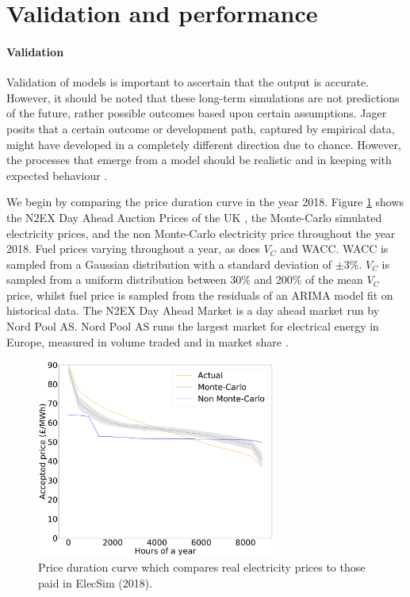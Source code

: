 \section{Validation and performance}
\paragraph{Validation}

Validation of models is important to ascertain that the output is accurate. However, it should be noted that these long-term simulations are not predictions of the future, rather possible outcomes based upon certain assumptions. Jager posits that a certain outcome or development path, captured by empirical data, might have developed in a completely different direction due to chance. However, the processes that emerge from a model should be realistic and in keeping with expected behaviour \cite{Jager2006a}.

We begin by comparing the price duration curve in the year 2018. Figure \ref{fig:price_duration_curve} shows the N2EX Day Ahead Auction Prices of the UK \cite{nordpool_2019}, the Monte-Carlo simulated electricity prices, and the non Monte-Carlo electricity price throughout the year 2018. Fuel prices varying throughout a year, as does $V_C$ and WACC. WACC is sampled from a Gaussian distribution with a standard deviation of $\pm3$\%. $V_C$ is sampled from a uniform distribution between 30\% and 200\% of the mean $V_C$ price, whilst fuel price is sampled from the residuals of an ARIMA model fit on historical data. The N2EX Day Ahead Market is a day ahead market run by Nord Pool AS. Nord Pool AS runs the largest market for electrical energy in Europe, measured in volume traded and in market share \cite{nordpool_2019}.
\begin{figure}
	\begin{center}
		\includegraphics[width=0.7\textwidth]{Chapter4/figures/load_price_duration_curve_comparison-monte-carlo.pdf}
		\caption{Price duration curve which compares real electricity prices to those paid in ElecSim (2018).}
		\label{fig:price_duration_curve}
	\end{center}
\end{figure}

